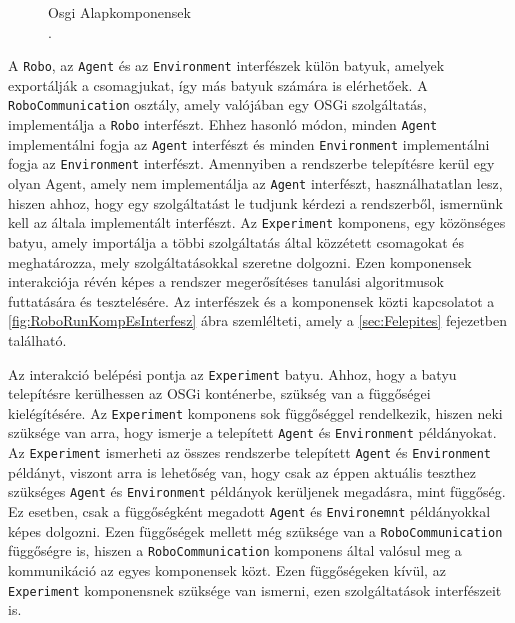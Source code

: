 \begin{figure}[h!]
  \centering
  \caption[A RoboRun projekt alapkomponensei]%
  {Osgi Alapkomponensek\\
  {\white .}\hfill\url{}}
  \label{fig:OsgiAlapkomponensek}
\end{figure}


A \texttt{Robo}, az \texttt{Agent} és az \texttt{Environment} interfészek külön batyuk, amelyek exportálják a csomagjukat, így más batyuk számára is elérhetőek. A \texttt{RoboCommunication} osztály, amely valójában egy OSGi szolgáltatás, implementálja a \texttt{Robo} interfészt. Ehhez hasonló módon, minden \texttt{Agent} implementálni fogja az \texttt{Agent} interfészt és minden \texttt{Environment} implementálni fogja az \texttt{Environment} interfészt. Amennyiben a rendszerbe telepítésre kerül egy olyan Agent, amely nem implementálja az \texttt{Agent} interfészt, használhatatlan lesz, hiszen ahhoz, hogy egy szolgáltatást le tudjunk kérdezi a rendszerből, ismernünk kell az általa implementált interfészt. Az \texttt{Experiment} komponens, egy közönséges batyu, amely importálja a többi szolgáltatás által közzétett csomagokat és meghatározza, mely szolgáltatásokkal szeretne dolgozni. Ezen komponensek interakciója révén képes a rendszer megerősítéses tanulási algoritmusok futtatására és tesztelésére. Az interfészek és a komponensek közti kapcsolatot a \ref{fig:RoboRunKompEsInterfesz} ábra szemlélteti, amely a \ref{sec:Felepites} fejezetben található.

Az interakció belépési pontja az \texttt{Experiment} batyu. Ahhoz, hogy a batyu telepítésre kerülhessen az OSGi konténerbe, szükség van a függőségei kielégítésére. Az \texttt{Experiment} komponens sok függőséggel rendelkezik, hiszen neki szüksége van arra, hogy ismerje a telepített \texttt{Agent} és \texttt{Environment} példányokat. Az \texttt{Experiment} ismerheti az összes rendszerbe telepített \texttt{Agent} és \texttt{Environment} példányt, viszont arra is lehetőség van, hogy csak az éppen aktuális teszthez szükséges \texttt{Agent} és \texttt{Environment} példányok kerüljenek megadásra, mint függőség. Ez esetben, csak a függőségként megadott \texttt{Agent} és \texttt{Environemnt} példányokkal képes dolgozni. Ezen függőségek mellett még szüksége van a \texttt{RoboCommunication} függőségre is, hiszen a \texttt{RoboCommunication} komponens által valósul meg a kommunikáció az egyes komponensek közt. Ezen függőségeken kívül, az \texttt{Experiment} komponensnek szüksége van ismerni, ezen szolgáltatások interfészeit is.


